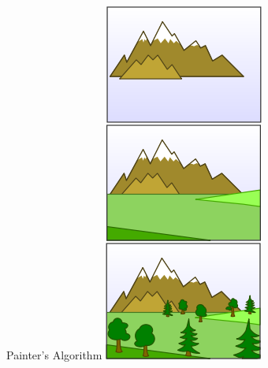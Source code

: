 \documentclass{lug}
\begin{document}
\begin{frame}{Painter's Algorithm}
{    }{
        \includegraphics[width=\textwidth]{graphics/painters_alg}
    }
\end{frame}
\end{document}
